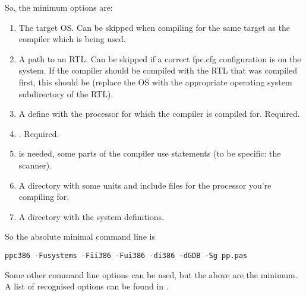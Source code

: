 So, the minimum options are:
\begin{enumerate}
\item The target OS. Can be skipped when compiling for the same target as
the compiler which is being used.
\item A path to an RTL. Can be skipped if a correct fpc.cfg configuration
is on the system. If the compiler should be compiled with the RTL that was
compiled first, this should be  (replace the OS with the 
appropriate operating system subdirectory of the RTL).
\item A define with the processor for which the compiler is compiled for. Required.
\item {}. Required.
\item {} is needed, some parts of the compiler use 
statements (to be specific: the scanner).
\item A directory with some units and include files for the processor you're compiling for.
\item A directory with the system definitions.
\end{enumerate}
So the absolute minimal command line is
\begin{verbatim}
ppc386 -Fusystems -Fii386 -Fui386 -di386 -dGDB -Sg pp.pas
\end{verbatim}

Some other command line options can be used, but the above are the
minimum. A list of recognised options can be found in .

